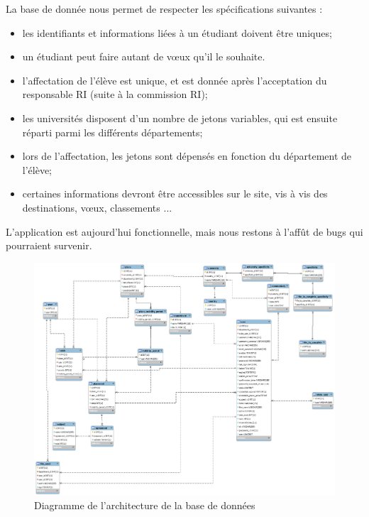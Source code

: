 La base de donnée nous permet de respecter les spécifications suivantes :
\bigbreak
\begin{itemize}
	\item les identifiants et informations liées à un étudiant doivent être uniques;
	\item un étudiant peut faire autant de vœux qu'il le souhaite.
	\item l'affectation de l'élève est unique, et est donnée après l'acceptation du responsable RI (suite à la commission RI);
	\item les universités disposent d'un nombre de jetons variables, qui est ensuite réparti parmi les différents départements;
	\item lors de l'affectation, les jetons sont dépensés en fonction du département de l'élève;
	\item certaines informations devront être accessibles sur le site, vis à vis des destinations, vœux, classements ...
\end{itemize}
\bigbreak
L'application est aujourd'hui fonctionnelle, mais nous restons à l'affût de bugs qui pourraient survenir. 
\newpage
\begin{figure}
	\centering
	\includegraphics[scale=0.35,angle=90]{images/graph.png}
	\caption{Diagramme de l'architecture de la base de données}
	\label{bdd}
\end{figure}
